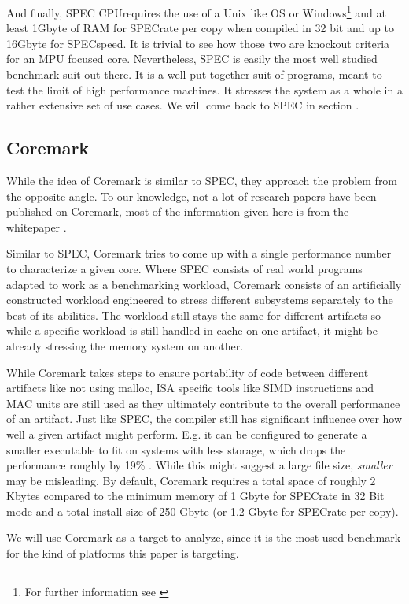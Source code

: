 \documentclass[../bachelor_paper.tex]{subfiles}
\begin{document}
And finally, \ac{SPEC} CPU\rsym requires the use of a Unix like \ac{OS} or Windows\footnote{For further information see \cite{SystemRequirementsCPU}} and at least 1Gbyte of \ac{RAM} for \ac{SPEC}rate per copy when compiled in 32 bit and up to 16Gbyte for \ac{SPEC}speed. It is trivial to see how those two are knockout criteria for an \ac{MPU} focused core. Nevertheless, \ac{SPEC} is easily the most well studied benchmark suit out there. It is a well put together suit of programs, meant to test the limit of high performance machines. It stresses the system as a whole in a rather extensive set of use cases. We will come back to \ac{SPEC} in section .

\subsection{Coremark}
    \label{ch:theo/benc/core}
While the idea of Coremark is similar to \ac{SPEC}, they approach the problem from the opposite angle. To our knowledge, not a lot of research papers have been published on Coremark, most of the information given here is from the whitepaper \cite{gal-onExploringCoremarkBenchmark2012}.

Similar to \ac{SPEC}, Coremark tries to come up with a single performance number to characterize a given core. Where \ac{SPEC} consists of real world programs adapted to work as a benchmarking workload, Coremark consists of an artificially constructed workload engineered to stress different subsystems separately to the best of its abilities. The workload still stays the same for different artifacts so while a specific workload is still handled in cache on one artifact, it might be already stressing the memory system on another.

While Coremark takes steps to ensure portability of code between different artifacts like not using malloc, \ac{ISA} specific tools like \ac{SIMD} instructions and \ac{MAC unit}s are still used as they ultimately contribute to the overall performance of an artifact. Just like \ac{SPEC}, the compiler still has significant influence over how well a given artifact might perform. E.g. it can be configured to generate a smaller executable to fit on systems with less storage, which drops the performance roughly by 19\% \cite{gal-onExploringCoremarkBenchmark2012}. While this might suggest a large file size, \textit{smaller} may be misleading. By default, Coremark requires a total space of roughly 2 Kbytes compared to the minimum memory of 1 Gbyte for \ac{SPEC}rate in 32 Bit mode and a total install size of 250 Gbyte (or 1.2 Gbyte for \ac{SPEC}rate per copy). \cite{SystemRequirementsCPU}

We will use Coremark as a target to analyze, since it is the most used benchmark for the kind of platforms this paper is targeting.


\isstandalone



\fi
\end{document}
